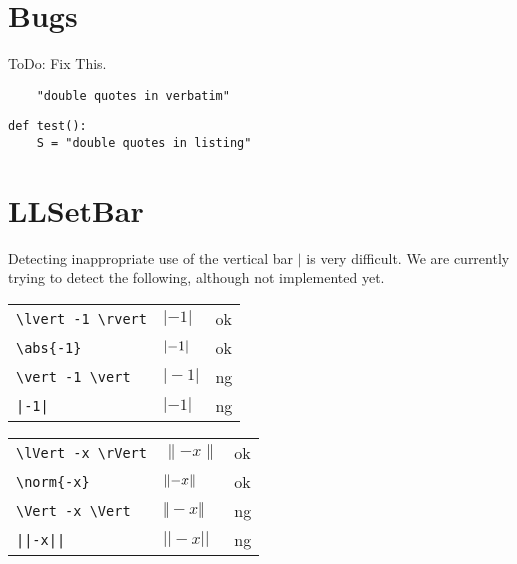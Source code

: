 \documentclass[a4paper]{article}
\newcommand{\tA}[1]{\textcolor{cA}{#1}}
\newcommand{\tD}[1]{\textcolor{cD}{#1}}
\begin{document}
\newpage
\appendix

\renewcommand\thesection{Appendix \Alph{section}}

\section{Bugs}

ToDo: Fix This.

\begin{verbatim}
	"double quotes in verbatim"
\end{verbatim}

\begin{lstlisting}
def test():
	S = "double quotes in listing"
\end{lstlisting}

\section{LLSetBar}

Detecting inappropriate use of the vertical bar $|$ is very difficult.
We are currently trying to detect the following, although not implemented yet.

\begin{table}[H]
	\centering
	\begin{tabular}{lll}
		\verb#\lvert -1 \rvert# & $\lvert -1 \rvert$ & \tA{ok} \\
		\verb#\abs{-1}#         & $\abs{-1}$         & \tA{ok} \\
		\verb#\vert -1 \vert#   & $\vert -1 \vert$   & \tD{ng} \\
		\verb#|-1|#             & $|-1|$             & \tD{ng} \\
	\end{tabular}
\end{table}


\begin{table}[H]
	\centering
	\begin{tabular}{lll}
		\verb#\lVert -x \rVert# & $\lVert -x \rVert$ & \tA{ok} \\
		\verb#\norm{-x}#        & $\norm{-x}$        & \tA{ok} \\
		\verb#\Vert -x \Vert#   & $\Vert -x \Vert$   & \tD{ng} \\
		\verb#||-x||#           & $||-x||$           & \tD{ng} \\
	\end{tabular}
\end{table}
\end{document}
